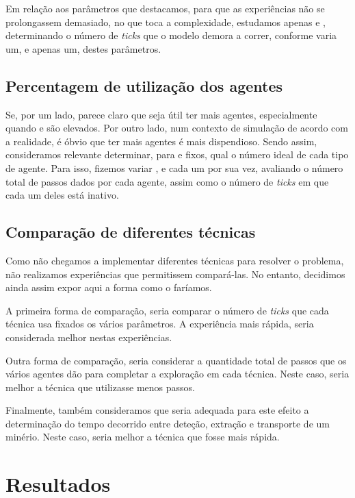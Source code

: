 \documentclass[12pt]{report}
\begin{document}
Em relação aos parâmetros que destacamos, para que as experiências não se prolongassem demasiado, no que toca a complexidade, estudamos apenas \size e \minerals, determinando o número de \emph{ticks} que o modelo demora a correr, conforme varia um, e apenas um, destes parâmetros.

\subsection{Percentagem de utilização dos agentes}

Se, por um lado, parece claro que seja útil ter mais agentes, especialmente quando \size e \minerals são elevados. Por outro lado, num contexto de simulação de acordo com a realidade, é óbvio que ter mais agentes é mais dispendioso. Sendo assim, consideramos relevante determinar, para \size e \minerals fixos, qual o número ideal de cada tipo de agente. Para isso, fizemos variar \spotters, \producers e \transporters cada um por sua vez, avaliando o número total de passos dados por cada agente, assim como o número de \emph{ticks} em que cada um deles está inativo.

\subsection{Comparação de diferentes técnicas}

Como não chegamos a implementar diferentes técnicas para resolver o problema, não realizamos experiências que permitissem compará-las. No entanto, decidimos ainda assim expor aqui a forma como o faríamos.

A primeira forma de comparação, seria comparar o número de \emph{ticks} que cada técnica usa fixados os vários parâmetros. A experiência mais rápida, seria considerada melhor nestas experiências.

Outra forma de comparação, seria considerar a quantidade total de passos que os vários agentes dão para completar a exploração em cada técnica. Neste caso, seria melhor a técnica que utilizasse menos passos.

Finalmente, também consideramos que seria adequada para este efeito a determinação do tempo decorrido entre deteção, extração e transporte de um minério. Neste caso, seria melhor a técnica que fosse mais rápida.

\section{Resultados}
\end{document}
